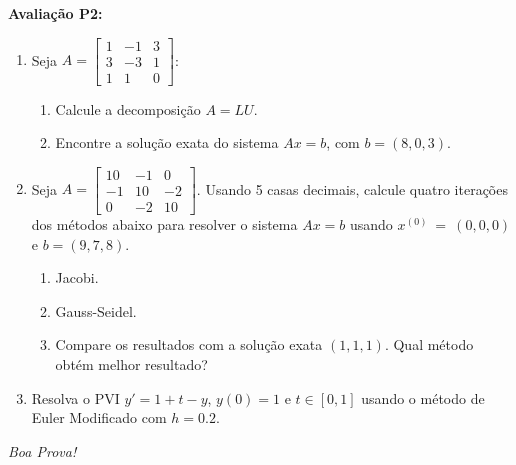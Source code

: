 \documentclass[a4paper,5pt]{amsbook}
\begin{document}
\vspace{1cm}
\textbf{Avalia\c{c}\~ao P2:}
\begin{enumerate}
	\item Seja $A = \left[\begin{array}{ccc}
				1 & -1 & 3 \\
				3 & -3 & 1 \\
				1 & 1 & 0
			\end{array}	\right]$:
		\begin{enumerate}
			\item Calcule a decomposi\c{c}\~ao $A = LU$.
			\item Encontre a solu\c{c}\~ao exata do sistema $Ax=b$, com $b = (8, 0, 3)$.
		\end{enumerate}
	\item Seja $A = \left[\begin{array}{ccc}
				10 &  -1 &    0 \\
				-1 &  10 &  -2 \\
				0 &  -2 &  10
			\end{array}	\right]$. Usando 5 casas decimais, calcule quatro
		itera\c{c}\~oes dos m\'etodos abaixo para resolver o sistema $Ax = b$ usando
		$x^{(0)}~=~(0,0,0)$ e $b=(9, 7, 8)$.
		\begin{enumerate}
			\item Jacobi.
			\item Gauss-Seidel.
			\item Compare os resultados com a solu\c{c}\~ao exata $(1, 1, 1)$. Qual
				m\'etodo obt\'em melhor resultado?
		\end{enumerate}
	\item Resolva o PVI $y' = 1 + t - y$, $y(0) = 1$ e $t\in{}[0, 1]$ usando o
		m\'etodo de Euler Modificado com $h=0.2$.
\end{enumerate}

\begin{flushright}
	\vspace{1cm}
	\textit{Boa Prova!}
\end{flushright}
\end{document}
